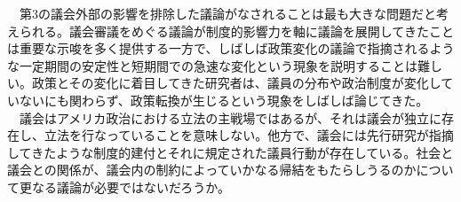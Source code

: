\documentclass{article}
\begin{document}
　第3の議会外部の影響を排除した議論がなされることは最も大きな問題だと考えられる。議会審議をめぐる議論が制度的影響力を軸に議論を展開してきたことは重要な示唆を多く提供する一方で、しばしば政策変化の議論で指摘されるような一定期間の安定性と短期間での急速な変化という現象を説明することは難しい。\citep*{Baumgartner1993-bc}政策とその変化に着目してきた研究者は、議員の分布や政治制度が変化していないにも関わらず、政策転換が生じるという現象をしばしば論じてきた。\citep*{Baumgartner1993-bc,Sabatier1993-id,Birkland1997-lq,Baumgartner2009-eb,Baumgartner2020-ee}\\
　議会はアメリカ政治における立法の主戦場ではあるが、それは議会が独立に存在し、立法を行なっていることを意味しない。他方で、議会には先行研究が指摘してきたような制度的建付とそれに規定された議員行動が存在している。社会と議会との関係が、議会内の制約によっていかなる帰結をもたらしうるのかについて更なる議論が必要ではないだろうか。\\


\end{document}
